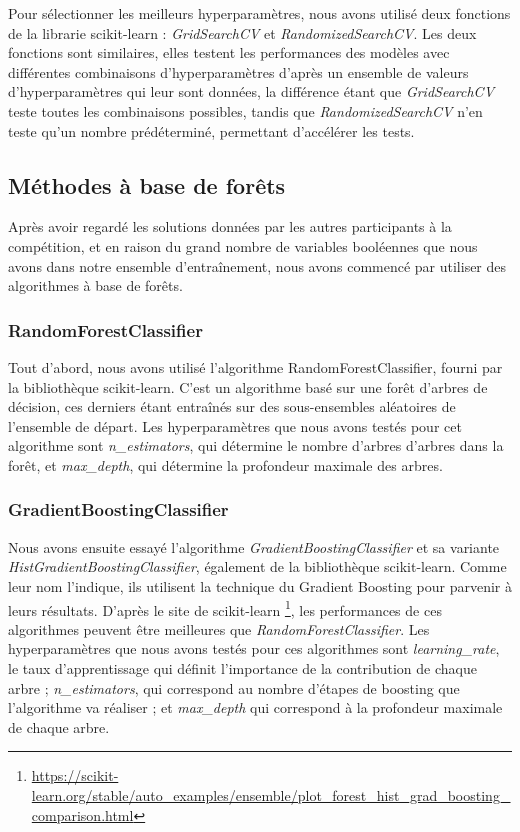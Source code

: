 \documentclass[a4paper]{article}
\begin{document}
    Pour sélectionner les meilleurs hyperparamètres, nous avons utilisé deux fonctions de la librarie scikit-learn : {\it GridSearchCV} et {\it RandomizedSearchCV}.
    Les deux fonctions sont similaires, elles testent les performances des modèles avec différentes combinaisons d'hyperparamètres d'après un ensemble de valeurs d'hyperparamètres
    qui leur sont données, la différence étant que {\it GridSearchCV} teste toutes les combinaisons possibles, tandis que
    {\it RandomizedSearchCV} n'en teste qu'un nombre prédéterminé, permettant d'accélérer les tests.

    \subsection{Méthodes à base de forêts}

    Après avoir regardé les solutions données par les autres participants à la compétition, et en raison du grand nombre de variables booléennes que nous avons dans notre
    ensemble d'entraînement, nous avons commencé par utiliser des algorithmes à base de forêts.

    \subsubsection{RandomForestClassifier}

    Tout d'abord, nous avons utilisé l'algorithme RandomForestClassifier, fourni par la bibliothèque scikit-learn.
    C'est un algorithme basé sur une forêt d'arbres de décision, ces derniers étant entraînés sur des sous-ensembles aléatoires de l'ensemble de départ.
    Les hyperparamètres que nous avons testés pour cet algorithme sont {\it n\_estimators}, qui détermine le nombre d'arbres d'arbres dans la forêt,
    et {\it max\_depth}, qui détermine la profondeur maximale des arbres.

    \subsubsection{GradientBoostingClassifier}

    Nous avons ensuite essayé l'algorithme {\it GradientBoostingClassifier} et sa variante {\it HistGradientBoostingClassifier}, également de la bibliothèque scikit-learn.
    Comme leur nom l'indique, ils utilisent la technique du Gradient Boosting pour parvenir à leurs résultats. 
    D'après le site de scikit-learn \footnote{\url{https://scikit-learn.org/stable/auto_examples/ensemble/plot_forest_hist_grad_boosting_comparison.html}}, les performances de
    ces algorithmes peuvent être meilleures que {\it RandomForestClassifier}.
    Les hyperparamètres que nous avons testés pour ces algorithmes sont {\it learning\_rate}, le taux d'apprentissage qui définit l'importance de la contribution de chaque arbre ;
    {\it n\_estimators}, qui correspond au nombre d'étapes de boosting que l'algorithme va réaliser ; et {\it max\_depth} qui correspond à la profondeur maximale de chaque arbre.
\end{document}
